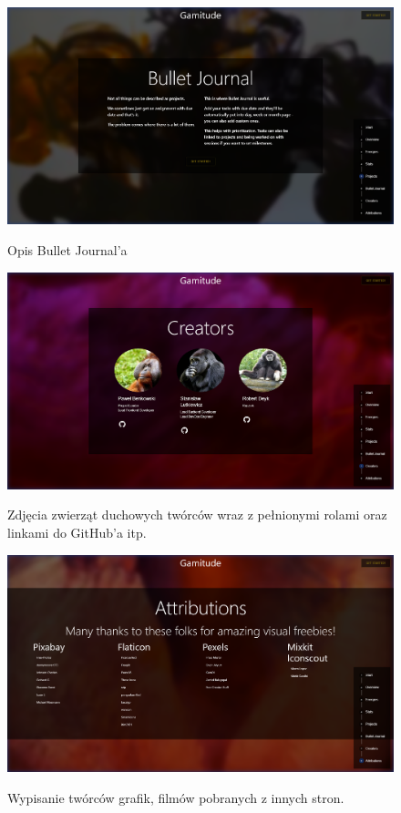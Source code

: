 \documentclass[a4paper,11pt]{report}
\begin{document}
\begin{figure}[H]
	\centering
	\includegraphics[scale=0.3]{prezentacja/Homepage_Bullet}\\
	\caption{Opis Bullet Journal'a}
	\label{fig:homepage_bullet}
\end{figure}
\begin{figure}[H]
	\centering
	\includegraphics[scale=0.3]{prezentacja/Homepage_Creators}\\
	\caption{Zdjęcia zwierząt duchowych twórców wraz z pełnionymi rolami oraz linkami do GitHub'a itp.}
	\label{fig:homepage_creators}
\end{figure}
\begin{figure}[H]
	\centering
	\includegraphics[scale=0.3]{prezentacja/Homepage_Attributions}\\
	\caption{Wypisanie twórców grafik, filmów pobranych z innych stron.}
	\label{fig:homepage_attributions}
\end{figure}
\end{document}
